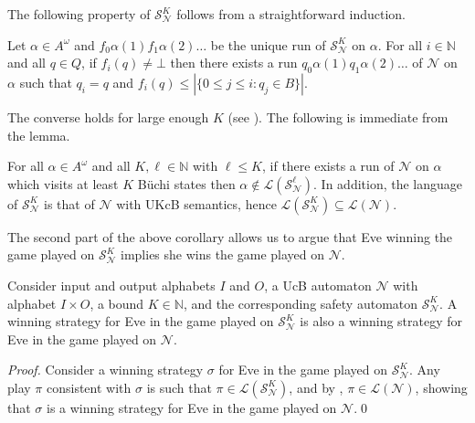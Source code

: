 \documentclass[runningheads,a4paper,draft]{llncs}
\newcommand{\eve}{Eve\xspace}
\newcommand{\calN}{\mathcal{N}}
\newcommand{\calS}{\mathcal{S}}
\renewcommand{\lang}[1]{\mathcal{L}({#1})}
\begin{document}
The following property of $\calS^K_\calN$ follows from a straightforward
induction.
\begin{lemma}\label{lem:runs-visits}
  Let $\alpha \in A^\omega$ and $f_0 \alpha(1) f_1 \alpha(2) \dots$ be the
  unique run of $\calS^K_\calN$ on $\alpha$. For all $i \in \mathbb{N}$ and
  all $q \in Q$, if $f_i(q) \neq \bot$ then there exists a run $q_0
  \alpha(1) q_1 \alpha(2) \dots$ of $\calN$ on $\alpha$ such that $q_i = q$
  and $f_i(q) \leq |\{0 \leq j \leq i : q_j \in B\}|$.
\end{lemma}
%
The converse holds for large enough $K$ (see ).
The following is immediate from the lemma.
%
\begin{corollary}\label{cor:safe-approx}
  For all $\alpha \in A^\omega$ and all $K,\ell \in \mathbb{N}$ with $\ell
  \leq K$, if there exists a run of $\calN$ on $\alpha$ which visits 
  at least $K$ B\"uchi states then $\alpha \not\in \lang{\calS^\ell_\calN}$.
  In addition, the
  language of \(\calS^K_\calN\) is that of \(\calN\) with UKcB semantics,
  hence \(\lang{\calS^K_\calN} \subseteq \lang{\calN}\).
\end{corollary}

The second part of the above corollary allows us to argue that \eve winning
the game played on $\calS^K_\calN$ implies she wins the game played on
$\calN$.
\begin{lemma}
    Consider input and output alphabets $I$ and $O$, a UcB
    automaton $\calN$ with alphabet $I \times O$, a bound $K \in \mathbb{N}$,
    and the corresponding safety automaton $\calS^K_\calN$. A
    winning strategy for \eve in the game played on $\calS^K_\calN$
    is also a winning strategy for \eve in the game played on
    $\calN$.
\end{lemma}
\begin{proof}
  Consider a winning strategy \(\sigma\) for \eve in the game played on
  \(\calS^K_\calN\).  Any play \(\pi\) consistent with \(\sigma\) is such that
  \(\pi \in \lang{\calS^K_\calN}\), and by ,
  \(\pi \in \lang{\calN}\), showing that \(\sigma\) is a winning strategy for
  \eve in the game played on \(\calN\).\qed
\end{proof}
\end{document}
